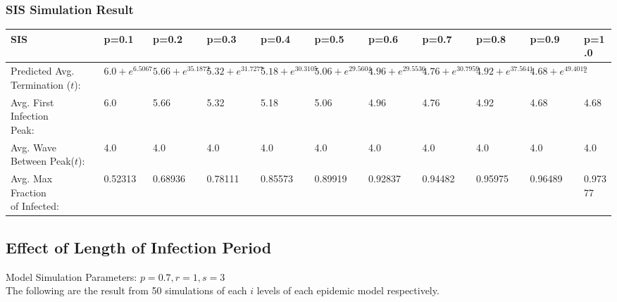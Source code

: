 \documentclass{subfile}
\begin{document}
  \subsubsection{SIS Simulation Result}
  {
  \small
  \begin{adjustbox}{max width=1.2\textwidth,center}
  \begin{tabular}{|l|l|l|l|l|l|l|l|l|l|l|}
    \hline
    SIS & p=0.1 & p=0.2 & p=0.3 & p=0.4 & p=0.5 & p=0.6 & p=0.7 & p=0.8 & p=0.9 & p=1.0\\
    \hline
    \makecell{Predicted\\Avg.\\Termination\\(\(t\)):} & \(6.0 + e^{6.5067}\) & \(5.66 + e^{35.1872}\) & \(5.32 + e^{31.7277}\) & \(5.18 + e^{30.3105}\) & \(5.06 + e^{29.5604}\) & \(4.96 + e^{29.5536}\) & \(4.76 + e^{30.7959}\) & \(4.92 + e^{37.5641}\) & \(4.68 + e^{49.4019}\) & -\footnotemark\\
    \hline
    \makecell{Avg. First\\Infection\\Peak:} & 6.0& 5.66& 5.32& 5.18& 5.06& 4.96& 4.76& 4.92& 4.68& 4.68\\
    \hline
    \makecell{Avg. Wave\\Between Peak(\(t\)):} & 4.0 & 4.0 & 4.0 & 4.0 & 4.0 & 4.0 & 4.0 & 4.0 & 4.0 & 4.0\\
    \hline
    \makecell{Avg. Max\\Fraction\\of Infected:} & 0.52313 & 0.68936 & 0.78111 & 0.85573 & 0.89919 & 0.92837 & 0.94482 & 0.95975 & 0.96489 & 0.97377\\
    \hline
  \end{tabular}
  \end{adjustbox}}

  \subsection{Effect of Length of Infection Period}
  Model Simulation Parameters: \(p=0.7, r=1, s=3\)\\
  The following are the result from 50 simulations of each \(i\) levels of each epidemic model respectively.
\end{document}
